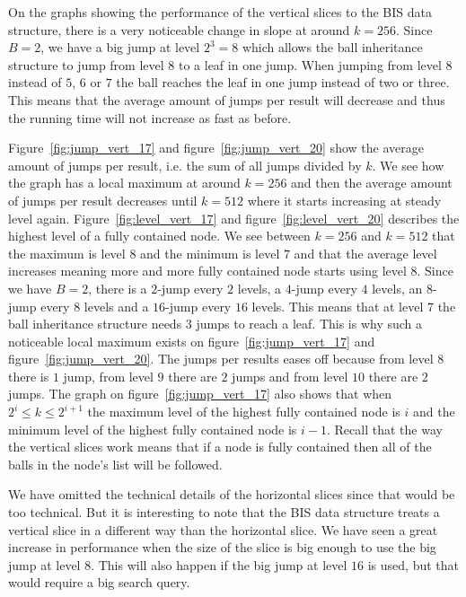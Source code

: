 On the graphs showing the performance of the vertical slices to the BIS data structure, there is a very noticeable change in slope at around $k=256$. Since $B=2$, we have a big jump at level $2^3 = 8$ which allows the ball inheritance structure to jump from level $8$ to a leaf in one jump. When jumping from level $8$ instead of $5$, $6$ or $7$ the ball reaches the leaf in one jump instead of two or three. This means that the average amount of jumps per result will decrease and thus the running time will not increase as fast as before.

Figure~\ref{fig:jump_vert_17} and figure~\ref{fig:jump_vert_20} show the average amount of jumps per result, i.e. the sum of all jumps divided by $k$. We see how the graph has a local maximum at around $k=256$ and then the average amount of jumps per result decreases until $k=512$ where it starts increasing at steady level again. Figure~\ref{fig:level_vert_17} and figure~\ref{fig:level_vert_20} describes the highest level of a fully contained node. We see between $k=256$ and $k=512$ that the maximum is level $8$ and the minimum is level $7$ and that the average level increases meaning more and more fully contained node starts using level $8$. Since we have $B=2$, there is a $2$-jump every $2$ levels, a $4$-jump every $4$ levels, an $8$-jump every $8$ levels and a $16$-jump every $16$ levels. This means that at level $7$ the ball inheritance structure needs $3$ jumps to reach a leaf. This is why such a noticeable local maximum exists on figure~\ref{fig:jump_vert_17} and figure~\ref{fig:jump_vert_20}. The jumps per results eases off because from level $8$ there is $1$ jump, from level $9$ there are $2$ jumps and from level $10$ there are $2$ jumps. The graph on figure~\ref{fig:jump_vert_17} also shows that when $2^i \leq k \leq 2^{i+1}$ the maximum level of the highest fully contained node is $i$ and the minimum level of the highest fully contained node is $i-1$. Recall that the way the vertical slices work means that if a node is fully contained then all of the balls in the node's list will be followed.

We have omitted the technical details of the horizontal slices since that would be too technical. But it is interesting to note that the BIS data structure treats a vertical slice in a different way than the horizontal slice. We have seen a great increase in performance when the size of the slice is big enough to use the big jump at level $8$. This will also happen if the big jump at level $16$ is used, but that would require a big search query.


